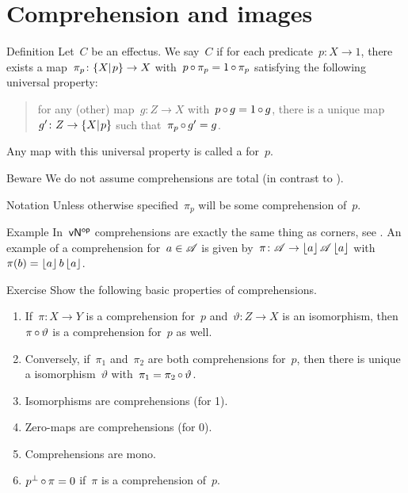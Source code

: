 \documentclass[b]{subfiles}
\begin{document}
\section{Comprehension and images}
\begin{parsec}%
\begin{point}{Definition}%
Let~$C$ be an effectus.
We say~$C$ 
    if for each predicate~$p \colon X \to 1$,
    there exists a map~$\pi_p \colon \{X|{\kern.2ex}p\} \to X$
    with~$p \mathop{\circ} \pi_p = 1 \mathop{\circ} \pi_p$
    satisfying the following universal property:
\begin{quote}
    for any (other) map~$g\colon Z \to X$
        with~$p \mathop{\circ} g = 1 \mathop{\circ} g$,
        there is a unique map~$g' \colon Z \to \{X|{\kern.2ex}p\}$
        such that~$\pi_p \mathop{\circ} g' = g$.
\end{quote}
Any  map with this universal property
    is called a  for~$p$.
\begin{point}{Beware}%
    We do not assume comprehensions are total
    (in contrast to \cite{effintro}).
\end{point}
\begin{point}{Notation}%
Unless otherwise specified~$\pi_p$ will be some
    comprehension of~$p$.
\end{point}
\end{point}
\begin{point}{Example}%
In~${\mathsf{vN}}{^{\mathsf{op}}}$ comprehensions are exactly the same thing
as corners, see .
An example of a comprehension for~$a \in \mathscr{A}$
    is given by~$\pi\colon \mathscr{A} \to \left\lfloor a\right\rfloor\mathscr{A}\left\lfloor a\right\rfloor$
    with~$\pi(b) = \left\lfloor a\right\rfloor b\left\lfloor a\right\rfloor$.
\end{point}
\begin{point}{Exercise}%
Show the following basic properties of comprehensions.
\begin{enumerate}
    \item If~$\pi\colon X \to Y$ is a comprehension for~$p$
                and~$\vartheta\colon Z \to X$ is an isomorphism,
                then~$\pi \mathop{\circ} \vartheta$ is a comprehension for~$p$
                as well.
    \item Conversely, if~$\pi_1$ and~$\pi_2$
            are both comprehensions for~$p$,
            then there is unique a isomorphism~$\vartheta$
            with~$\pi_1 = \pi_2 \mathop{\circ} \vartheta$.
    \item Isomorphisms are comprehensions (for 1).
    \item Zero-maps are comprehensions (for 0).
    \item Comprehensions are mono.
    \item $p^\perp \mathop{\circ} \pi = 0$ if~$\pi$ is a comprehension of~$p$.
\end{enumerate}
\end{point}
\end{parsec}
\end{document}
